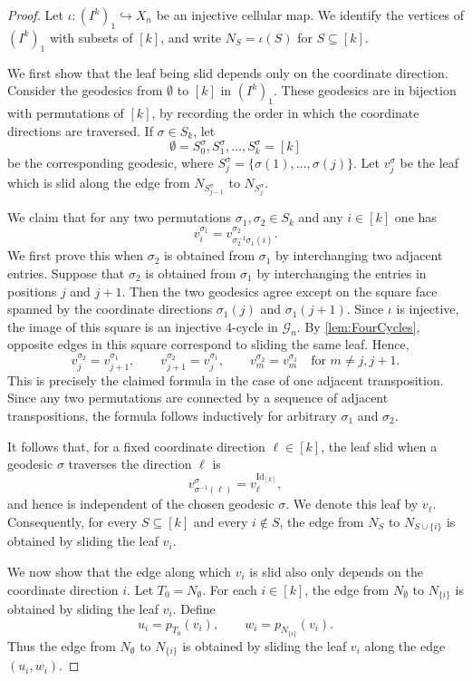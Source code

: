 \documentclass[reqno,dvipsnames]{amsart}
\theoremstyle{plain}
\numberwithin{equation}{section}
\theoremstyle{definition}
\begin{document}
		\begin{proof}
			Let $\iota:(I^k)_1\hookrightarrow X_n$ be an injective cellular map. We identify the vertices of $(I^k)_1$ with subsets of $[k]$, and write $N_S=\iota(S)$ for $S\subseteq [k]$.

			We first show that the leaf being slid depends only on the coordinate direction. Consider the geodesics from $\emptyset$ to $[k]$ in $(I^k)_1$. These geodesics are in bijection with permutations of $[k]$, by recording the order in which the coordinate directions are traversed. If $\sigma\in S_k$, let
			\[
			\emptyset=S_0^\sigma,S_1^\sigma,\ldots,S_k^\sigma=[k]
			\]
			be the corresponding geodesic, where $S_j^\sigma=\{\sigma(1),\ldots,\sigma(j)\}$. Let $v_j^\sigma$ be the leaf which is slid along the edge from $N_{S_{j-1}^\sigma}$ to $N_{S_j^\sigma}$.

			We claim that for any two permutations $\sigma_1,\sigma_2\in S_k$ and any $i\in[k]$ one has
			\[
			v_i^{\sigma_1}=v_{\sigma_2^{-1}\sigma_1(i)}^{\sigma_2}.
			\]
			We first prove this when $\sigma_2$ is obtained from $\sigma_1$ by interchanging two adjacent entries. Suppose that $\sigma_2$ is obtained from $\sigma_1$ by interchanging the entries in positions $j$ and $j+1$. Then the two geodesics agree except on the square face spanned by the coordinate directions $\sigma_1(j)$ and $\sigma_1(j+1)$. Since $\iota$ is injective, the image of this square is an injective $4$-cycle in $\mathcal{G}_n$. By \autoref{lem:FourCycles}, opposite edges in this square correspond to sliding the same leaf. Hence,
			\[
			v_j^{\sigma_2}=v_{j+1}^{\sigma_1},\qquad v_{j+1}^{\sigma_2}=v_j^{\sigma_1},\qquad v_m^{\sigma_2}=v_m^{\sigma_1}\quad\text{for }m\neq j,j+1.
			\]
			This is precisely the claimed formula in the case of one adjacent transposition. Since any two permutations are connected by a sequence of adjacent transpositions, the formula follows inductively for arbitrary $\sigma_1$ and $\sigma_2$.

			It follows that, for a fixed coordinate direction $\ell\in[k]$, the leaf slid when a geodesic $\sigma$ traverses the direction $\ell$ is
			\[
			v_{\sigma^{-1}(\ell)}^\sigma=v_\ell^{\operatorname{Id}_{[k]}},
			\]
			and hence is independent of the chosen geodesic $\sigma$. We denote this leaf by $v_\ell$. Consequently, for every $S\subseteq[k]$ and every $i\notin S$, the edge from $N_S$ to $N_{S\cup\{i\}}$ is obtained by sliding the leaf $v_i$.

			We now show that the edge along which $v_i$ is slid also only depends on the coordinate direction $i$. Let $T_0=N_\emptyset$. For each $i\in[k]$, the edge from $N_\emptyset$ to $N_{\{i\}}$ is obtained by sliding the leaf $v_i$. Define
			\[
			u_i=p_{T_0}(v_i),\qquad w_i=p_{N_{\{i\}}}(v_i).
			\]
			Thus the edge from $N_\emptyset$ to $N_{\{i\}}$ is obtained by sliding the leaf $v_i$ along the edge $(u_i,w_i)$.


\end{proof}
\end{document}
